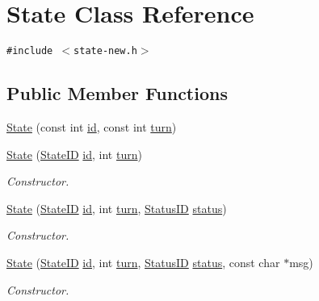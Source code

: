 \hypertarget{classState}{
\section{State Class Reference}
\label{classState}
}
{\tt \#include $<$state-new.h$>$}

\subsection*{Public Member Functions}
\begin{CompactItemize}
\item 
\hyperlink{classState_1b4e314c21378ef15c4ef854d4c88001}{State} (const int \hyperlink{classState_f747db9527dfb6ea0a58fe7bfeb3ac80}{id}, const int \hyperlink{classState_97418aee9e2f52608a6ab606c4594aff}{turn})
\item 
\hyperlink{classState_efadc9ab55d44f059e139b65c759dc14}{State} (\hyperlink{state_8h_2c309f64131cbfdae6d95e6591f208e6}{StateID} \hyperlink{classState_f747db9527dfb6ea0a58fe7bfeb3ac80}{id}, int \hyperlink{classState_97418aee9e2f52608a6ab606c4594aff}{turn})
\begin{CompactList}\small\item\em Constructor. \item\end{CompactList}\item 
\hyperlink{classState_0bfcbd427c3d009f71c627516ec17b25}{State} (\hyperlink{state_8h_2c309f64131cbfdae6d95e6591f208e6}{StateID} \hyperlink{classState_f747db9527dfb6ea0a58fe7bfeb3ac80}{id}, int \hyperlink{classState_97418aee9e2f52608a6ab606c4594aff}{turn}, \hyperlink{state_8h_26688ca6a181d6c6cf4f21d9839d4125}{StatusID} \hyperlink{classState_75d3a38b16f7081c4e961f6e7e2708b7}{status})
\begin{CompactList}\small\item\em Constructor. \item\end{CompactList}\item 
\hyperlink{classState_4ff7773f710d19259128cd975945b8d2}{State} (\hyperlink{state_8h_2c309f64131cbfdae6d95e6591f208e6}{StateID} \hyperlink{classState_f747db9527dfb6ea0a58fe7bfeb3ac80}{id}, int \hyperlink{classState_97418aee9e2f52608a6ab606c4594aff}{turn}, \hyperlink{state_8h_26688ca6a181d6c6cf4f21d9839d4125}{StatusID} \hyperlink{classState_75d3a38b16f7081c4e961f6e7e2708b7}{status}, const char $\ast$msg)
\begin{CompactList}\small\item\em Constructor. \item\end{CompactList}\item 

\end{CompactItemize}
